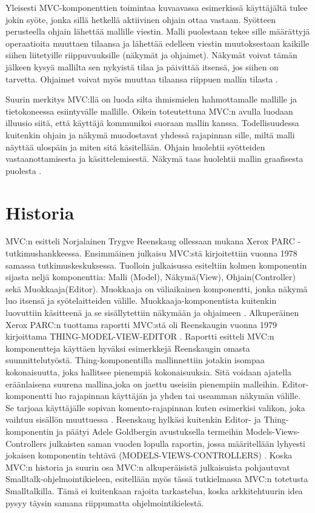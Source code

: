 \documentclass[utf8]{gradu3}
\begin{document}
Yleisesti MVC-komponenttien toimintaa kuvaavassa esimerkissä käyttäjältä tulee jokin syöte, jonka sillä hetkellä aktiivinen ohjain ottaa vastaan. Syötteen perusteella ohjain lähettää mallille viestin. Malli puolestaan tekee sille määrättyjä operaatioita muuttaen tilaansa ja lähettää edelleen viestin muutoksestaan kaikille siihen liitetyille riippuvuuksille (näkymät ja ohjaimet). Näkymät
voivat tämän jälkeen kysyä mallilta sen nykyistä tilaa ja päivittää itsensä, jos siihen on tarvetta. Ohjaimet voivat myös muuttaa tilaansa riippuen mallin tilasta \parencite[s. 4]{krasner_desc}. 

Suurin merkitys MVC:llä on luoda silta ihmismielen hahmottamalle mallille ja tietokoneessa esiintyvälle mallille. Oikein toteutettuna MVC:n avulla luodaan illuusio siitä, että käyttäjä kommunikoi suoraan mallin kanssa. Todellisuudessa kuitenkin ohjain ja näkymä muodostavat yhdessä rajapinnan sille, miltä malli näyttää ulospäin ja miten sitä käsitellään. Ohjain huolehtii syötteiden vastaanottamisesta ja käsittelemisestä. Näkymä taas huolehtii mallin graafisesta puolesta \parencite[s. 11-12]{reenskaug_tools}. 

\section{Historia}
MVC:n esitteli Norjalainen Trygve Reenskaug ollessaan mukana Xerox PARC -tutkimushankkeessa. 
Ensimmäinen julkaisu MVC:stä kirjoitettiin vuonna 1978 samassa tutkimuskeskuksessa. 
Tuolloin julkaisussa esiteltiin kolmen komponentin sijasta neljä komponenttia: 
Malli (Model), Näkymä(View), Ohjain(Controller) sekä Muokkaaja(Editor). Muokkaaja on 
väliaikainen komponentti, jonka näkymä luo itsensä ja syötelaitteiden välille. 
Muokkaaja-komponentista kuitenkin luovuttiin käsitteenä ja se sisällytettiin näkymään 
ja ohjaimeen \parencite{xerox}. Alkuperäinen Xerox PARC:n tuottama raportti MVC:stä oli Reenskaugin 
vuonna 1979 kirjoittama THING-MODEL-VIEW-EDITOR \parencite{xerox-thing}. Raportti esitteli MVC:n 
komponentteja käyttäen hyväksi esimerkkejä Reenskaugin omasta suunnittelutyöstä. Thing-komponentilla mallinnettiin
jotakin isompaa kokonaisuutta, joka hallitsee pienempiä kokonaisuuksia. Sitä voidaan ajatella eräänlaisena suurena mallina,joka on jaettu useisiin pienempiin malleihin. Editor-komponentti luo rajapinnan käyttäjän ja yhden tai useamman näkymän välille. Se tarjoaa käyttäjälle sopivan komento-rajapinnan kuten esimerkisi valikon, joka vaihtuu sisällön muuttuessa \parencite{xerox-thing}. Reenskaug hylkäsi kuitenkin Editor- ja Thing-komponentin ja  päätyi Adele Goldbergin avustuksella termeihin Models-Views-Controllers julkaisten saman vuoden lopulla raportin, jossa määritellään lyhyesti jokaisen komponentin tehtävä (MODELS-VIEWS-CONTROLLERS) \parencite{xerox-original}. Koska MVC:n historia ja suurin osa MVC:n alkuperäisistä julkaisuista pohjautuvat Smalltalk-ohjelmointikieleen, esitellään myös tässä tutkielmassa MVC:n totetusta Smalltalkilla.
Tämä ei kuitenkaan rajoita tarkastelua, koska arkkitehtuurin idea pysyy täysin samana riippumatta ohjelmointikielestä.
\end{document}
